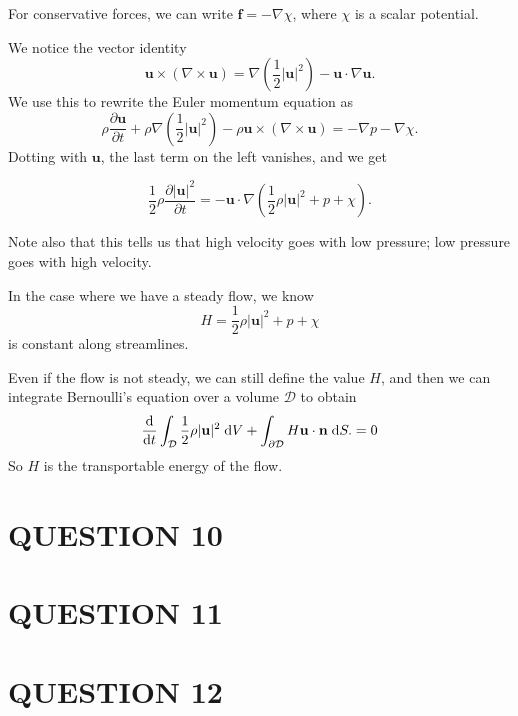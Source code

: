\documentclass[a4paper]{article}
\begin{document}
For conservative forces, we can write $\mathbf{f} = -\nabla \chi$, where $\chi$ is a scalar potential.

We notice the vector identity
\[
\mathbf{u}\times (\nabla \times \mathbf{u}) = \nabla\left(\frac{1}{2}|\mathbf{u}|^2\right) - \mathbf{u}\cdot \nabla \mathbf{u}.
\]
We use this to rewrite the Euler momentum equation as
\[
\rho \frac{\partial \mathbf{u}}{\partial t} + \rho \nabla \left(\frac{1}{2}|\mathbf{u}|^2\right) - \rho \mathbf{u}\times (\nabla \times \mathbf{u}) = -\nabla p - \nabla \chi.
\]
Dotting with $\mathbf{u}$, the last term on the left vanishes, and we get
\begin{prop}
	\[
	\frac{1}{2}\rho \frac{\partial|\mathbf{u}|^2}{\partial t} = -\mathbf{u}\cdot \nabla \left(\frac{1}{2} \rho |\mathbf{u}|^2 + p + \chi\right).
	\]
\end{prop}
Note also that this tells us that high velocity goes with low pressure; low pressure goes with high velocity.

In the case where we have a steady flow, we know
\[
H = \frac{1}{2}\rho |\mathbf{u}|^2 + p + \chi
\]
is constant along streamlines.

Even if the flow is not steady, we can still define the value $H$, and then we can integrate Bernoulli's equation over a volume $\mathcal{D}$ to obtain
\[
\frac{\mathrm{d}}{\mathrm{d} t}\int_{\mathcal{D}} \frac{1}{2}\rho |\mathbf{u}|^2 \;\mathrm{d} V + \int_{\partial \mathcal{D}} H \mathbf{u}\cdot \mathbf{n} \;\mathrm{d} S. = 0 
\]
So $H$ is the transportable energy of the flow.




\section{QUESTION 10}
\section{QUESTION 11}
\section{QUESTION 12}
\end{document}

